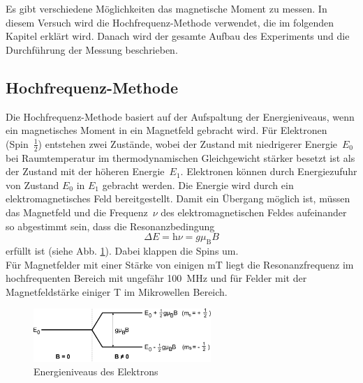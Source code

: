 Es gibt verschiedene Möglichkeiten das magnetische Moment zu messen. In diesem Versuch wird die Hochfrequenz-Methode verwendet, die im folgenden Kapitel erklärt wird. Danach wird der gesamte Aufbau des Experiments und die Durchführung der Messung beschrieben.

\subsection{Hochfrequenz-Methode}
Die Hochfrequenz-Methode basiert auf der Aufspaltung der Energieniveaus, wenn ein magnetisches Moment in ein Magnetfeld gebracht wird. Für Elektronen (Spin~$\frac{1}{2}$) entstehen zwei Zustände, wobei der Zustand mit niedrigerer Energie~$E_0$ bei Raumtemperatur im thermodynamischen Gleichgewicht stärker besetzt ist als der Zustand mit der höheren Energie~$E_1$. Elektronen können durch Energiezufuhr von Zustand $E_0$ in $E_1$ gebracht werden. Die Energie wird durch ein elektromagnetisches Feld bereitgestellt. Damit ein Übergang möglich ist, müssen das Magnetfeld und die Frequenz~$\nu$ des elektromagnetischen Feldes aufeinander so abgestimmt sein, dass die Resonanzbedingung 
\begin{equation}
	\Delta E = \textrm{h} \nu = g \mu_\textrm{B} B
\end{equation}
erfüllt ist (siehe Abb. \ref{fig:elektron}). Dabei klappen die Spins um. \\
Für Magnetfelder mit einer Stärke von einigen \si{\milli\tesla} liegt die Resonanzfrequenz im hochfrequenten Bereich mit ungefähr \SI{100}{\mega\hertz} und für Felder mit der Magnetfeldstärke einiger \si{\tesla} im Mikrowellen Bereich.
\\
\begin{figure}[h!]
	\centering
	\includegraphics[width=0.6\textwidth]{Anleitung_Abb6.pdf}
	\caption{Energieniveaus  des Elektrons \cite{V28}}
	\label{fig:elektron}
\end{figure}


\clearpage
